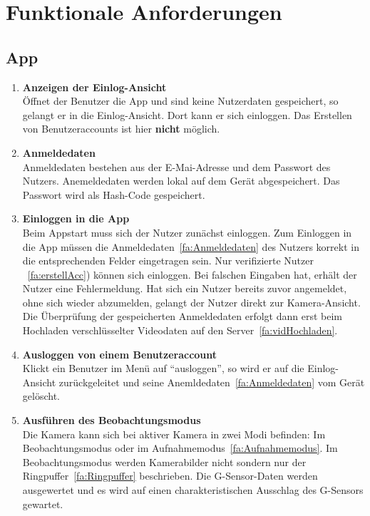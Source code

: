 \chapter{Funktionale Anforderungen}

\section{\gls{App}}
\begin{enumerate}
\renewcommand{\labelenumi}{\textbf{\theenumi}}
\renewcommand{\theenumi}{FA\arabic{enumi}0}
\setcounter{enumi}{99}
\item \textbf{Anzeigen der Einlog-Ansicht} \hfill \\
Öffnet der Benutzer die \gls{App} und sind keine Nutzerdaten gespeichert, so gelangt er in die Einlog-Ansicht. Dort kann er sich einloggen. Das Erstellen von Benutzeraccounts ist hier \textbf{nicht} möglich.

\item \label{fa:Anmeldedaten}\textbf{Anmeldedaten} \hfill \\
Anmeldedaten bestehen aus der E-Mai-Adresse und dem Passwort des Nutzers. Anemeldedaten werden lokal auf dem Gerät abgespeichert. Das Passwort wird als \gls{Hash-Code} gespeichert.

\item \textbf{Einloggen in die \gls{App}} \hfill \\
Beim Appstart muss sich der Nutzer zunächst einloggen. Zum Einloggen in die \gls{App} müssen die Anmeldedaten~\eqref{fa:Anmeldedaten} des Nutzers korrekt in die entsprechenden Felder eingetragen sein. Nur verifizierte Nutzer ~\eqref{fa:erstellAcc}) können sich einloggen. Bei falschen Eingaben hat, erhält der Nutzer eine Fehlermeldung. Hat sich ein Nutzer bereits zuvor angemeldet, ohne sich wieder abzumelden, gelangt der Nutzer direkt zur Kamera-Ansicht. Die Überprüfung der gespeicherten Anmeldedaten erfolgt dann erst beim Hochladen verschlüsselter Videodaten auf den Server~\eqref{fa:vidHochladen}.

\item \label{fa:logOut}\textbf{Ausloggen von einem Benutzeraccount} \hfill \\
Klickt ein Benutzer im Menü auf ``ausloggen'', so wird er auf die Einlog-Ansicht zurückgeleitet und seine Anemldedaten~\eqref{fa:Anmeldedaten} vom Gerät gelöscht.

\item \label{fa:Beobachtungsmodus}\textbf{Ausführen des Beobachtungsmodus} \hfill \\
Die Kamera kann sich bei aktiver Kamera in zwei Modi befinden: Im Beobachtungsmodus oder im Aufnahmemodus~\eqref{fa:Aufnahmemodus}.
Im Beobachtungsmodus werden Kamerabilder nicht  sondern nur der \gls{Ringpuffer}~\eqref{fa:Ringpuffer} beschrieben. Die \gls{G-Sensor}-Daten werden ausgewertet und es wird auf einen charakteristischen Ausschlag des G-Sensors gewartet.


\end{enumerate}
